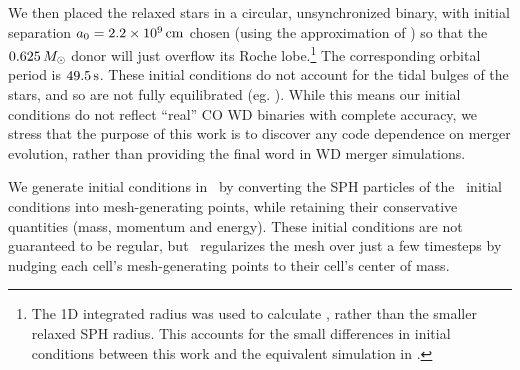 We then placed the relaxed stars in a circular, unsynchronized binary, with initial separation $\azero = 2.2\times10^9\,\mrm{cm}$ chosen (using the approximation of \citealt{eggl83}) so that the $0.625\,\Msun$ donor will just overflow its Roche lobe.\footnote{The 1D integrated radius was used to calculate \azero, rather than the smaller relaxed SPH radius.  This accounts for the small differences in initial conditions between this work and the equivalent simulation in \citeal{zhu+13}.}  The corresponding orbital period is $49.5\,\mathrm{s}$.  These initial conditions do not account for the tidal bulges of the stars, and so are not fully equilibrated (eg. \citealt{dan+11}).  While this means our initial conditions do not reflect ``real'' CO WD binaries with complete accuracy, we stress that the purpose of this work is to discover any code dependence on merger evolution, rather than providing the final word in WD merger simulations.

We generate initial conditions in \arepo\ by converting the SPH particles of the \gasoline\ initial conditions into mesh-generating points, while retaining their conservative quantities (mass, momentum and energy).  These initial conditions are not guaranteed to be regular, but \arepo\ regularizes the mesh over just a few timesteps by nudging each cell's mesh-generating points to their cell's center of mass.  


